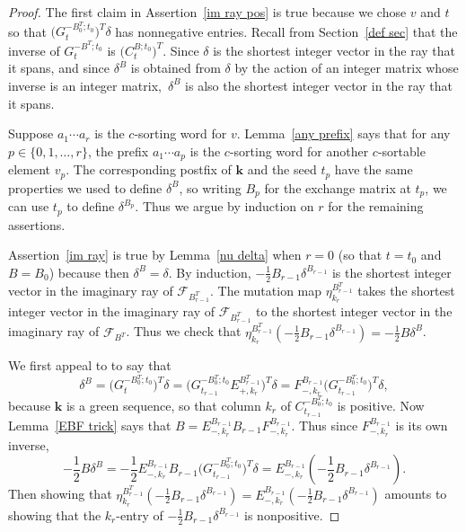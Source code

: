 \documentclass[10pt]{article}
\theoremstyle{definition}
\theoremstyle{remark}
\numberwithin{equation}{section}
\newcommand{\set}[1]{{\lbrace #1 \rbrace}}
\newcommand{\F}{{\mathcal F}}
\newcommand{\0}{{\mathbf{0}}}
\newcommand{\kk}{{\boldsymbol{k}}}
\begin{document}
\begin{proof}%
  The first claim in Assertion~\ref{im ray pos} is true because we chose $v$ and $t$ so that $\bigl(G_t^{-B_0^T;t_0}\bigr)^T\delta$ has nonnegative entries.
Recall from Section~\ref{def sec} that the inverse of $G_t^{-B^T;t_0}$ is $\bigl(C_t^{B;t_0}\bigr)^T$.
Since $\delta$ is the shortest integer vector in the ray that it spans, and since $\delta^B$ is obtained from $\delta$ by the action of an integer matrix whose inverse is an integer matrix,~$\delta^B$ is also the shortest integer vector in the ray that it spans.

Suppose $a_1\cdots a_r$ is the $c$-sorting word for $v$.
Lemma~\ref{any prefix} says that for any ${p\in\set{0,1,\ldots,r}}$, the prefix $a_1\cdots a_p$ is the $c$-sorting word for another $c$-sortable element $v_p$.
The corresponding postfix of $\kk$ and the seed $t_p$ have the same properties we used to define $\delta^B$, so writing $B_p$ for the exchange matrix at $t_p$, we can use $t_p$ to define $\delta^{B_p}$.
Thus we argue by induction on $r$ for the remaining assertions.

Assertion~\ref{im ray} is true by Lemma~\ref{nu delta} when $r=0$ (so that $t=t_0$ and $B=B_0$) because then $\delta^B=\delta$.
By induction, $-\frac12B_{r-1}\delta^{B_{r-1}}$ is the shortest integer vector in the imaginary ray of $\F_{B_{r-1}^T}$.
The mutation map $\eta_{k_r}^{B_{r-1}^T}$ takes the shortest integer vector in the imaginary ray of $\F_{B_{r-1}^T}$ to the shortest integer vector in the imaginary ray of $\F_{B^T}$. 
Thus we check that $\eta_{k_r}^{B_{r-1}^T}(-\frac12B_{r-1}\delta^{B_{r-1}})=-\frac12B\delta^{B}$.

We first appeal to \cite[Proposition~1.3]{NZ} to say that 
\[\delta^B=\bigl(G_t^{-B_0^T;t_0}\bigr)^T\delta=\bigl(G_{t_{r-1}}^{-B_0^T;t_0}E_{+,k_r}^{B_{r-1}^T}\bigr)^T\delta=F_{-,k_r}^{B_{r-1}}\bigl(G_{t_{r-1}}^{-B_0^T;t_0}\bigr)^T\delta,\]
because $\kk$ is a green sequence, so that column $k_r$ of $C_{t_{r-1}}^{-B_0^T;t_0}$ is positive.
Now Lemma~\ref{EBF trick} says that $B=E_{-,k_r}^{B_{r-1}}B_{r-1}F_{-,k_r}^{B_{r-1}}$.
Thus since $F_{-,k_r}^{B_{r-1}}$ is its own inverse, 
\[-\frac12B\delta^B=-\frac12E_{-,k_r}^{B_{r-1}}B_{r-1}\bigl(G_{t_{r-1}}^{-B_0^T;t_0}\bigr)^T\delta=E_{-,k_r}^{B_{r-1}}(-\frac12B_{r-1}\delta^{B_{r-1}}).\]
Then showing that $\eta_{k_r}^{B_{r-1}^T}(-\frac12B_{r-1}\delta^{B_{r-1}})=E_{-,k_r}^{B_{r-1}}(-\frac12B_{r-1}\delta^{B_{r-1}})$ amounts to showing that the $k_r$-entry of $-\frac12B_{r-1}\delta^{B_{r-1}}$ is nonpositive.


\end{proof}
\end{document}
